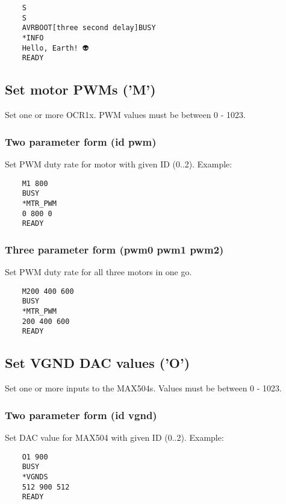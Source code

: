 \documentclass{article}
\begin{document}
\begin{lstlisting}
    S
    S
    AVRBOOT[three second delay]BUSY
    *INFO
    Hello, Earth! 👽
    READY
\end{lstlisting}


\subsection{Set motor PWMs ('M')}

Set one or more OCR1x.
PWM values must be between 0 - 1023.

\subsubsection{Two parameter form (id pwm)}

Set PWM duty rate for motor with given ID (0..2). Example:

\begin{lstlisting}
    M1 800
    BUSY
    *MTR_PWM
    0 800 0
    READY
\end{lstlisting}

\subsubsection{Three parameter form (pwm0 pwm1 pwm2)}

Set PWM duty rate for all three motors in one go.

\begin{lstlisting}
    M200 400 600
    BUSY
    *MTR_PWM
    200 400 600
    READY
\end{lstlisting}

\subsection{Set VGND DAC values ('O')}

Set one or more inputs to the MAX504s.
Values must be between 0 - 1023.

\subsubsection{Two parameter form (id vgnd)}

Set DAC value for MAX504 with given ID (0..2). Example:

\begin{lstlisting}
    O1 900
    BUSY
    *VGNDS
    512 900 512
    READY
\end{lstlisting}
\end{document}
